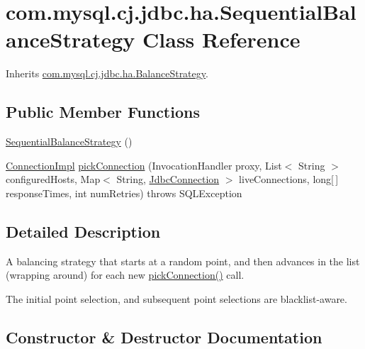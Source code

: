 \hypertarget{classcom_1_1mysql_1_1cj_1_1jdbc_1_1ha_1_1_sequential_balance_strategy}{}\section{com.\+mysql.\+cj.\+jdbc.\+ha.\+Sequential\+Balance\+Strategy Class Reference}
\label{classcom_1_1mysql_1_1cj_1_1jdbc_1_1ha_1_1_sequential_balance_strategy}


Inherits \mbox{\hyperlink{interfacecom_1_1mysql_1_1cj_1_1jdbc_1_1ha_1_1_balance_strategy}{com.\+mysql.\+cj.\+jdbc.\+ha.\+Balance\+Strategy}}.

\subsection*{Public Member Functions}
\begin{DoxyCompactItemize}
\item 
\mbox{\hyperlink{classcom_1_1mysql_1_1cj_1_1jdbc_1_1ha_1_1_sequential_balance_strategy_af14fe3304b28a573292df8fb37b1a81f}{Sequential\+Balance\+Strategy}} ()
\item 
\mbox{\hyperlink{classcom_1_1mysql_1_1cj_1_1jdbc_1_1_connection_impl}{Connection\+Impl}} \mbox{\hyperlink{classcom_1_1mysql_1_1cj_1_1jdbc_1_1ha_1_1_sequential_balance_strategy_a2fb26910a5b3161faa35e0264d5c7adc}{pick\+Connection}} (Invocation\+Handler proxy, List$<$ String $>$ configured\+Hosts, Map$<$ String, \mbox{\hyperlink{interfacecom_1_1mysql_1_1cj_1_1jdbc_1_1_jdbc_connection}{Jdbc\+Connection}} $>$ live\+Connections, long\mbox{[}$\,$\mbox{]} response\+Times, int num\+Retries)  throws S\+Q\+L\+Exception 
\end{DoxyCompactItemize}


\subsection{Detailed Description}
A balancing strategy that starts at a random point, and then advances in the list (wrapping around) for each new \mbox{\hyperlink{classcom_1_1mysql_1_1cj_1_1jdbc_1_1ha_1_1_sequential_balance_strategy_a2fb26910a5b3161faa35e0264d5c7adc}{pick\+Connection()}} call.

The initial point selection, and subsequent point selections are blacklist-\/aware. 

\subsection{Constructor \& Destructor Documentation}
\mbox{\label{classcom_1_1mysql_1_1cj_1_1jdbc_1_1ha_1_1_sequential_balance_strategy_af14fe3304b28a573292df8fb37b1a81f}} 
